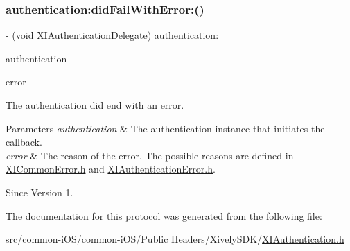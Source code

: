 \subsubsection{\texorpdfstring{authentication\+:did\+Fail\+With\+Error\+:()}{authentication:didFailWithError:()}}
{\footnotesize\ttfamily -\/ (void X\+I\+Authentication\+Delegate) authentication\+: \begin{DoxyParamCaption}\item[{(\hyperlink{class_x_i_authentication}{X\+I\+Authentication} $\ast$)}]{authentication }\item[{didFailWithError:(N\+S\+Error $\ast$)}]{error }\end{DoxyParamCaption}}



The authentication did end with an error. 


\begin{DoxyParams}{Parameters}
{\em authentication} & The authentication instance that initiates the callback. \\
\hline
{\em error} & The reason of the error. The possible reasons are defined in \hyperlink{_x_i_common_error_8h}{X\+I\+Common\+Error.\+h} and \hyperlink{_x_i_authentication_error_8h}{X\+I\+Authentication\+Error.\+h}. \\
\hline
\end{DoxyParams}
\begin{DoxySince}{Since}
Version 1. 
\end{DoxySince}


The documentation for this protocol was generated from the following file\+:\begin{DoxyCompactItemize}
\item 
src/common-\/i\+O\+S/common-\/i\+O\+S/\+Public Headers/\+Xively\+S\+D\+K/\hyperlink{_x_i_authentication_8h}{X\+I\+Authentication.\+h}\end{DoxyCompactItemize}
